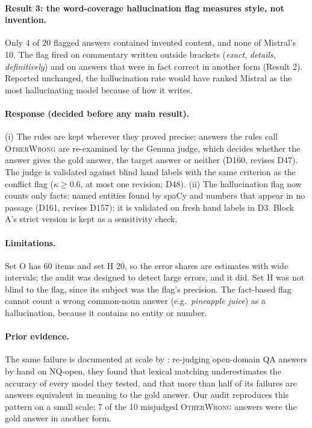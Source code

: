 \documentclass[11pt,a4paper]{report}
\begin{document}
\paragraph{Result 3: the word-coverage hallucination flag measures style, not
invention.}
Only 4 of 20 flagged answers contained invented content, and none of Mistral's
10. The flag fired on commentary written outside brackets (\emph{exact},
\emph{details}, \emph{definitively}) and on answers that were in fact correct
in another form (Result 2). Reported unchanged, the hallucination rate would
have ranked Mistral as the most hallucinating model because of how it writes.

\paragraph{Response (decided before any main result).}
(i) The rules are kept wherever they proved precise; answers the rules call
\textsc{OtherWrong} are re-examined by the Gemma judge, which decides whether
the answer gives the gold answer, the target answer or neither (D160, revises
D47). The judge is validated against blind hand labels with the same criterion
as the conflict flag ($\kappa \ge 0.6$, at most one revision; D48).
(ii) The hallucination flag now counts only facts: named entities found by
spaCy and numbers that appear in no passage (D161, revises D157); it is
validated on fresh hand labels in D3. Block A's strict version is kept as a
sensitivity check.

\paragraph{Limitations.}
Set O has 60 items and set H 20, so the error shares are estimates with wide
intervals; the audit was designed to detect large errors, and it did. Set H was
not blind to the flag, since its subject was the flag's precision. The
fact-based flag cannot count a wrong common-noun answer (e.g.\ \emph{pineapple
juice}) as a hallucination, because it contains no entity or number.

\paragraph{Prior evidence.}
The same failure is documented at scale by \citet{kamalloo2023evaluating}:
re-judging open-domain QA answers by hand on NQ-open, they found that lexical
matching underestimates the accuracy of every model they tested, and that more
than half of its failures are answers equivalent in meaning to the gold answer.
Our audit reproduces this pattern on a small scale: 7 of the 10 misjudged
\textsc{OtherWrong} answers were the gold answer in another form.
\end{document}
